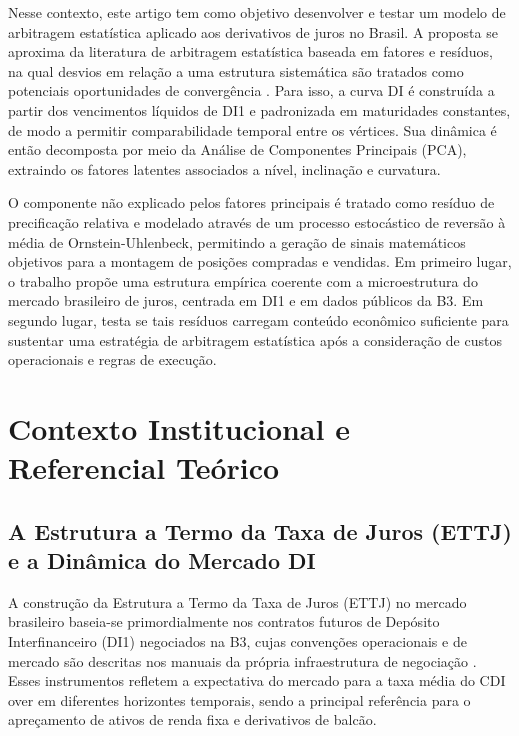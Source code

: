 \documentclass[fleqn]{rbfin}
\begin{document}

Nesse contexto, este artigo tem como objetivo desenvolver e testar um modelo de arbitragem estatística aplicado aos derivativos de juros no Brasil. A proposta se aproxima da literatura de arbitragem estatística baseada em fatores e resíduos, na qual desvios em relação a uma estrutura sistemática são tratados como potenciais oportunidades de convergência \cite{avellaneda2010statistical}. Para isso, a curva DI é construída a partir dos vencimentos líquidos de DI1 e padronizada em maturidades constantes, de modo a permitir comparabilidade temporal entre os vértices. Sua dinâmica é então decomposta por meio da Análise de Componentes Principais (PCA), extraindo os fatores latentes associados a nível, inclinação e curvatura.



O componente não explicado pelos fatores principais é tratado como resíduo de precificação relativa e modelado através de um processo estocástico de reversão à média de Ornstein-Uhlenbeck, permitindo a geração de sinais matemáticos objetivos para a montagem de posições compradas e vendidas. Em primeiro lugar, o trabalho propõe uma estrutura empírica coerente com a microestrutura do mercado brasileiro de juros, centrada em DI1 e em dados públicos da B3. Em segundo lugar, testa se tais resíduos carregam conteúdo econômico suficiente para sustentar uma estratégia de arbitragem estatística após a consideração de custos operacionais e regras de execução.


\section{Contexto Institucional e Referencial Teórico}

\subsection{A Estrutura a Termo da Taxa de Juros (ETTJ) e a Dinâmica do Mercado DI}
A construção da Estrutura a Termo da Taxa de Juros (ETTJ) no mercado brasileiro baseia-se primordialmente nos contratos futuros de Depósito Interfinanceiro (DI1) negociados na B3, cujas convenções operacionais e de mercado são descritas nos manuais da própria infraestrutura de negociação \cite{b3manual}. Esses instrumentos refletem a expectativa do mercado para a taxa média do CDI over em diferentes horizontes temporais, sendo a principal referência para o apreçamento de ativos de renda fixa e derivativos de balcão.
\end{document}
